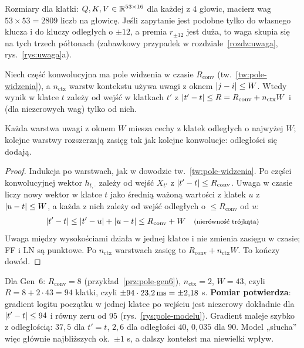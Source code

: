 \begin{naliczbach}
Rozmiary dla klatki: $Q,K,V\in\mathbb{R}^{53\times16}$ dla każdej z $4$ głowic, macierz wag $53\times53=2809$ liczb na głowicę. Jeśli zapytanie jest podobne tylko do własnego klucza i do kluczy odległych o $\pm12$, a premia $r_{\pm12}$ jest duża, to waga skupia się na tych trzech półtonach (zabawkowy przypadek w rozdziale~\ref{rozdz:uwaga}, rys.~\ref{rys:uwaga}a).
\end{naliczbach}

\begin{twierdzenie}\label{tw:pole-sieci}
Niech część konwolucyjna ma pole widzenia w czasie $R_\mathrm{conv}$ (tw.~\ref{tw:pole-widzenia}), a $n_\mathrm{ctx}$ warstw kontekstu używa uwagi z oknem $\left\lvert j-i\right\rvert\le W$. Wtedy wynik w klatce $t$ zależy od wejść w klatkach $t'$ z $\left\lvert t'-t\right\rvert\le R=R_\mathrm{conv}+n_\mathrm{ctx}W$ i (dla niezerowych wag) tylko od nich.
\end{twierdzenie}
\begin{pomyslDowodu}
Każda warstwa uwagi z oknem $W$ miesza cechy z klatek odległych o najwyżej $W$; kolejne warstwy rozszerzają zasięg tak jak kolejne konwolucje: odległości się dodają.
\end{pomyslDowodu}
\begin{proof}
Indukcja po warstwach, jak w dowodzie tw.~\ref{tw:pole-widzenia}. Po części konwolucyjnej wektor $h_{t,\cdot}$ zależy od wejść $X_{t'}$ z $\left\lvert t'-t\right\rvert\le R_\mathrm{conv}$. Uwaga w czasie liczy nowy wektor w klatce $t$ jako średnią ważoną wartości z klatek $u$ z $\left\lvert u-t\right\rvert\le W$, a każda z nich zależy od wejść odległych o $\le R_\mathrm{conv}$ od $u$:
\begin{align*}
\left\lvert t'-t\right\rvert\le\left\lvert t'-u\right\rvert+\left\lvert u-t\right\rvert\le R_\mathrm{conv}+W && \text{\footnotesize (nierówność trójkąta)}
\end{align*}
Uwaga między wysokościami działa w jednej klatce i nie zmienia zasięgu w czasie; FF i LN są punktowe. Po $n_\mathrm{ctx}$ warstwach zasięg to $R_\mathrm{conv}+n_\mathrm{ctx}W$. To kończy dowód.
\end{proof}

Dla Gen~6: $R_\mathrm{conv}=8$ (przykład~\ref{prz:pole-gen6}), $n_\mathrm{ctx}=2$, $W=43$, czyli $R=8+2\cdot43=94$ klatki, czyli $\pm94\cdot23{,}2\,\mathrm{ms}=\pm2{,}18$ s. \textbf{Pomiar potwierdza}: gradient logitu początku w jednej klatce po wejściu jest niezerowy dokładnie dla $\left\lvert t'-t\right\rvert\le94$ i równy zeru od $95$ (rys.~\ref{rys:pole-modelu}).
Gradient maleje szybko z odległością: $37{,}5$ dla $t'=t$, $2{,}6$ dla odległości $40$, $0{,}035$ dla $90$. Model „słucha” więc głównie najbliższych ok.\ $\pm1$ s, a dalszy kontekst ma niewielki wpływ.

